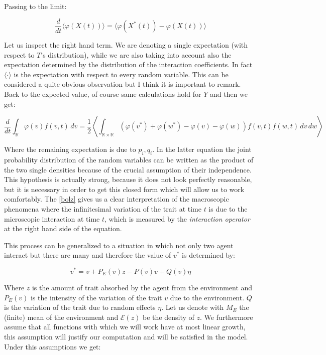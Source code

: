 \documentclass[12pt,a4paper]{article}
\numberwithin{theorem}{section}
\numberwithin{definition}{section}
\numberwithin{example}{section}
\numberwithin{exercise}{section}
\newcommand{\R}{\mathbb{R}}
\begin{document}
Passing to the limit:

    \[\frac{d}{dt}\langle\varphi(X(t))\rangle=\langle\varphi(X^{*}(t))-\varphi(X(t))\rangle\]

Let us inspect the right hand term. We are denoting a single expectation (with respect to $T$'s distribution), while we are also taking into account also the expectation determined by the distribution of the interaction coefficients. In fact $\langle\cdot\rangle$ is the expectation with respect to every random variable. This can be considered a quite obvious observation but I think it is important to remark. Back to the expected value,
of course same calculations hold for $Y$ and then we get:

\begin{equation}\label{bolz}
    \frac{d}{dt}\int_{\R}\varphi(v)f(v,t) \,dv=\frac{1}{2}\left\langle\int_{\R\times\R}(\varphi(v^{*})+\varphi(w^{*})-\varphi(v)-\varphi(w))f(v,t)f(w,t) \,dv\,dw\right\rangle
\end{equation}

Where the remaining expectation is due to $p_i,q_i$. In the latter equation the joint probability distribution of the random variables can be written as the product of the two single densities because of the crucial assumption of their independence. This hypothesis is actually strong, because it does not look perfectly reasonable, but it is necessary in order to get this closed form which will allow us to work comfortably. The \ref{bolz} gives us a clear interpretation of the macroscopic phenomena where the infinitesimal variation of the trait at time $t$ is due to the microscopic interaction at time $t$, which is measured by the \textit{interaction operator} at the right hand side of the equation. 

This process can be generalized to a situation in which not only two agent interact but there are many and therefore the value of $v^{*}$ is determined by:

\begin{equation}\label{interactiongen}
    v^{*} = v + P_E(v)z - P(v)v + Q(v)\eta
\end{equation}

Where $z$ is the amount of trait absorbed by the agent from the environment and $P_E(v)$ is the intensity of the variation of the trait $v$ due to the environment. $Q$ is the variation of the trait due to random effects $\eta$. Let us denote with $M_E$ the (finite) mean of the environment and $\mathcal{E}(z)$ be the density of $z$. We furthermore assume that all functions with which we will work have at most linear growth, this assumption will justify our computation and will be satisfied in the model. Under this assumptions we get:
\end{document}
